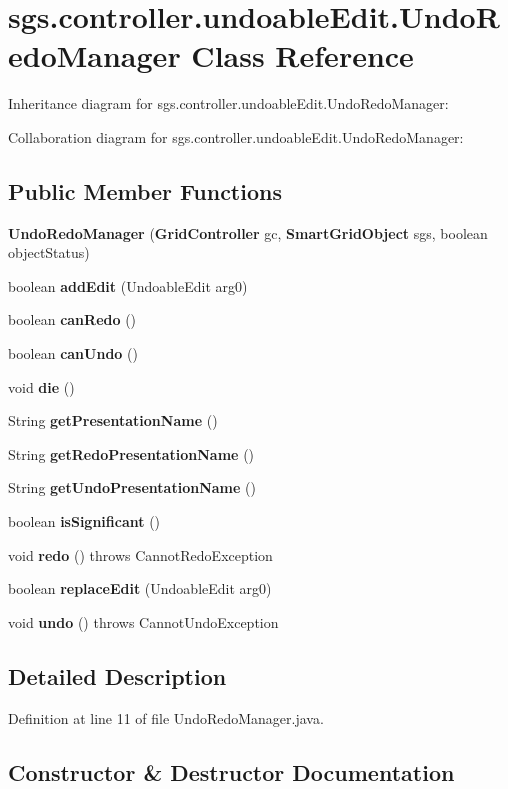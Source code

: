 \section{sgs.\-controller.\-undoable\-Edit.\-Undo\-Redo\-Manager Class Reference}
\label{classsgs_1_1controller_1_1undoable_edit_1_1_undo_redo_manager}


Inheritance diagram for sgs.\-controller.\-undoable\-Edit.\-Undo\-Redo\-Manager\-:


Collaboration diagram for sgs.\-controller.\-undoable\-Edit.\-Undo\-Redo\-Manager\-:
\subsection*{Public Member Functions}
\begin{DoxyCompactItemize}
\item 
{\bf Undo\-Redo\-Manager} ({\bf Grid\-Controller} gc, {\bf Smart\-Grid\-Object} sgs, boolean object\-Status)
\item 
boolean {\bf add\-Edit} (Undoable\-Edit arg0)
\item 
boolean {\bf can\-Redo} ()
\item 
boolean {\bf can\-Undo} ()
\item 
void {\bf die} ()
\item 
String {\bf get\-Presentation\-Name} ()
\item 
String {\bf get\-Redo\-Presentation\-Name} ()
\item 
String {\bf get\-Undo\-Presentation\-Name} ()
\item 
boolean {\bf is\-Significant} ()
\item 
void {\bf redo} ()  throws Cannot\-Redo\-Exception 
\item 
boolean {\bf replace\-Edit} (Undoable\-Edit arg0)
\item 
void {\bf undo} ()  throws Cannot\-Undo\-Exception 
\end{DoxyCompactItemize}


\subsection{Detailed Description}


Definition at line 11 of file Undo\-Redo\-Manager.\-java.



\subsection{Constructor \& Destructor Documentation}
